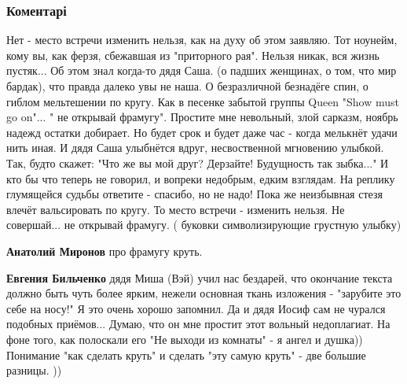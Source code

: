  
 
 
 
 
\subsubsection{Коментарі}
\label{sec:24_11_2021.fb.bilchenko_evgenia.1.depressia_djadja_sasha.cmt}

\begin{itemize} %


\begin{multicols}{2}
\obeycr
Нет - место встречи изменить нельзя,
как на духу об этом заявляю.
Тот ноунейм, кому вы, как ферзя,
сбежавшая из "приторного рая".
\smallskip
Нельзя никак, вся жизнь пустяк...
Об этом знал когда-то дядя Саша.
(о падших женщинах, о том, что мир бардак),
что правда далеко увы не наша.
\smallskip
О безразличной безнадёге спин,
о гиблом мельтешении по кругу.
Как в песенке забытой группы Queen
"Show must go on"... " не открывай фрамугу".
\smallskip
Простите мне невольный, злой сарказм,
ноябрь надежд остатки добирает.
Но будет срок и будет даже час -
когда мелькнёт удачи нить иная.
\smallskip
И дядя Саша улыбнётся вдруг,
несвоственной мгновению улыбкой.
Так, будто скажет: "Что же вы мой друг?
Дерзайте! Будущность так зыбка..."
\smallskip
И кто бы что теперь не говорил,
и вопреки недобрым, едким взглядам.
На реплику глумящейся судьбы
ответите - спасибо, но не надо!
\smallskip
Пока же неизбывная стезя
влечёт вальсировать по кругу.
То место встречи - изменить нельзя.
Не совершай... не открывай фрамугу.
\smallskip
( буковки символизирующие грустную улыбку)
\restorecr
\end{multicols}

\begin{itemize} %
\textbf{Анатолий Миронов} про фрамугу круть.

\textbf{Евгения Бильченко} дядя Миша (Вэй) учил нас бездарей, что окончание текста должно быть чуть более ярким, нежели основная ткань изложения - "зарубите это себе на носу!" Я это очень хорошо запомнил. Да и дядя Иосиф сам не чурался подобных приёмов... Думаю, что он мне простит этот вольный недоплагиат. На фоне того, как полоскали его "Не выходи из комнаты" - я ангел и душка))
Понимание "как сделать круть" и сделать "эту самую круть" - две большие разницы. ))



\end{itemize}
\end{itemize}
